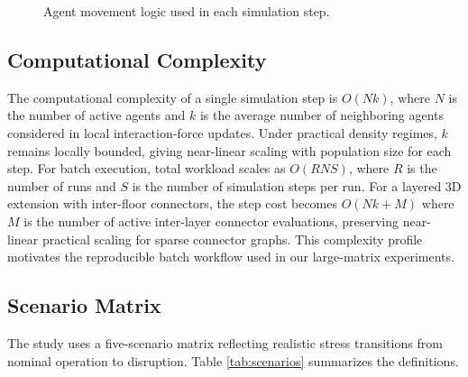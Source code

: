 \documentclass[journal]{IEEEtran}
\begin{document}
\begin{figure}[t]
\centering
{}
\caption{Agent movement logic used in each simulation step.}
\label{fig:agent_logic}
\end{figure}

\subsection{Computational Complexity}
The computational complexity of a single simulation step is $O(Nk)$, where $N$ is the number of active agents and $k$ is the average number of neighboring agents considered in local interaction-force updates. Under practical density regimes, $k$ remains locally bounded, giving near-linear scaling with population size for each step. For batch execution, total workload scales as $O(RNS)$, where $R$ is the number of runs and $S$ is the number of simulation steps per run. For a layered 3D extension with inter-floor connectors, the step cost becomes $O(Nk + M)$ where $M$ is the number of active inter-layer connector evaluations, preserving near-linear practical scaling for sparse connector graphs. This complexity profile motivates the reproducible batch workflow used in our large-matrix experiments.

\subsection{Scenario Matrix}
The study uses a five-scenario matrix reflecting realistic stress transitions from nominal operation to disruption. Table \ref{tab:scenarios} summarizes the definitions.
\end{document}
